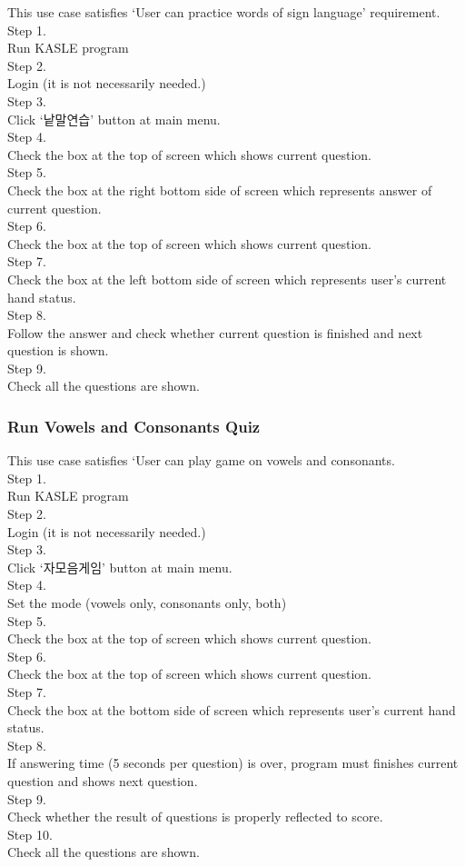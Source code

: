 \documentclass[10pt,journal,compsoc]{IEEEtran}
\begin{document}
This use case satisfies ‘User can practice words of sign language’ requirement.
\\Step 1.
\\Run KASLE program
\\Step 2.
\\Login (it is not necessarily needed.)
\\Step 3.
\\Click ‘낱말연습’ button at main menu.
\\Step 4. 
\\Check the box at the top of screen which shows current question.
\\Step 5.
\\Check the box at the right bottom side of screen which represents answer of current question.
\\Step 6.
\\Check the box at the top of screen which shows current question.
\\Step 7.
\\Check the box at the left bottom side of screen which represents user’s current hand status.
\\Step 8. 
\\Follow the answer and check whether current question is finished and next question is shown.
\\Step 9.
\\Check all the questions are shown.

\subsubsection{Run Vowels and Consonants Quiz\\}
This use case satisfies ‘User can play game on vowels and consonants.
\\Step 1.
\\Run KASLE program
\\Step 2.
\\Login (it is not necessarily needed.)
\\Step 3.
\\Click ‘자모음게임’ button at main menu.
\\Step 4. 
\\Set the mode (vowels only, consonants only, both)
\\Step 5.
\\Check the box at the top of screen which shows current question.
\\Step 6.
\\Check the box at the top of screen which shows current question.
\\Step 7.
\\Check the box at the bottom side of screen which represents user’s current hand status.
\\Step 8. 
\\If answering time (5 seconds per question) is over, program must finishes current question and shows next question.
\\Step 9.
\\ Check whether the result of questions is properly reflected to score.
\\Step 10.
\\ Check all the questions are shown.
\end{document}
